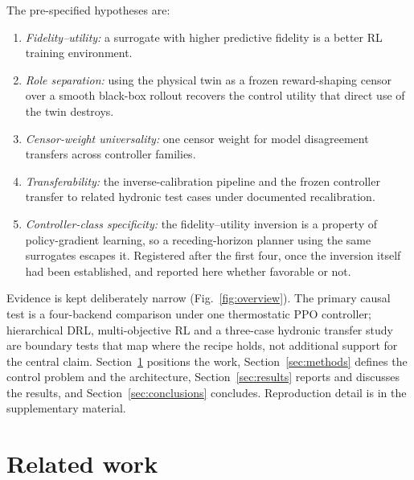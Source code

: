 \documentclass{ieeeaccess}
\begin{document}
The pre-specified hypotheses are:

\begin{enumerate}[label=\textbf{H\arabic*.},leftmargin=2.8em,itemsep=2pt,topsep=3pt]
\item \emph{Fidelity--utility:} a surrogate with higher predictive fidelity is a
better RL training environment.
\item \emph{Role separation:} using the physical twin as a frozen reward-shaping
censor over a smooth black-box rollout recovers the control utility that direct
use of the twin destroys.
\item \emph{Censor-weight universality:} one censor weight for model
disagreement transfers across controller families.
\item \emph{Transferability:} the inverse-calibration pipeline and the frozen
controller transfer to related hydronic test cases under documented
recalibration.
\item \emph{Controller-class specificity:} the fidelity--utility inversion is a
property of policy-gradient learning, so a receding-horizon planner using the
same surrogates escapes it. Registered after the first four, once the inversion
itself had been established, and reported here whether favorable or not.
\end{enumerate}

Evidence is kept deliberately narrow (Fig.~\ref{fig:overview}). The primary
causal test is a four-backend comparison under one thermostatic PPO controller;
hierarchical DRL, multi-objective RL and a three-case hydronic transfer study
are boundary tests that map where the recipe holds, not additional support for
the central claim. Section~\ref{sec:related} positions the work,
Section~\ref{sec:methods} defines the control problem and the architecture,
Section~\ref{sec:results} reports and discusses the results, and
Section~\ref{sec:conclusions} concludes. Reproduction detail is in the
supplementary material.

\section{Related work}\label{sec:related}
\end{document}
